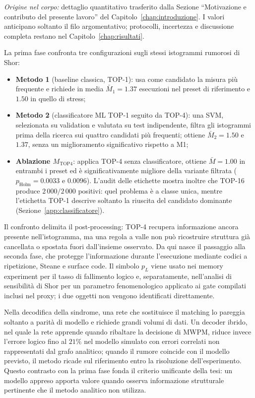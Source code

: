 \begin{onehalfspace}
\noindent\textit{Origine nel corpo:} dettaglio quantitativo trasferito dalla Sezione ``Motivazione e contributo del presente lavoro'' del Capitolo~\ref{chap:introduzione}. I valori anticipano soltanto il filo argomentativo; protocolli, incertezza e discussione completa restano nel Capitolo~\ref{chap:risultati}.

La prima fase confronta tre configurazioni sugli stessi istogrammi rumorosi di Shor:

\begin{itemize}
    \item \textbf{Metodo 1} (baseline classica, TOP-1): usa come candidato la misura più frequente e richiede in media $\bar{M}_1=1.37$ esecuzioni nel preset di riferimento e $1.50$ in quello di stress;
    \item \textbf{Metodo 2} (classificatore \ac{ML} TOP-1 seguito da TOP-4): una \ac{SVM}, selezionata su validation e valutata su test indipendente, filtra gli istogrammi prima della ricerca sui quattro candidati più frequenti; ottiene $\bar{M}_2=1.50$ e $1.37$, senza un miglioramento significativo rispetto a M1;
    \item \textbf{Ablazione $M_{\mathrm{TOP4}}$}: applica TOP-4 senza classificatore, ottiene $\bar{M}=1.00$ in entrambi i preset ed è significativamente migliore della variante filtrata ($p_{\mathrm{Holm}}=0.0033$ e $0.0096$). L'audit delle etichette mostra inoltre che TOP-16 produce $2\,000/2\,000$ positivi: quel problema è a classe unica, mentre l'etichetta TOP-1 descrive soltanto la riuscita del candidato dominante (Sezione~\ref{app:classificatore}).
\end{itemize}

Il confronto delimita il post-processing: TOP-4 recupera informazione ancora presente nell'istogramma, ma una regola a valle non può ricostruire struttura già cancellata o spostata fuori dall'insieme osservato. Da qui nasce il passaggio alla seconda fase, che protegge l'informazione durante l'esecuzione mediante codici a ripetizione, Steane e surface code. Il simbolo $p_L$ viene usato nei memory experiment per il tasso di fallimento logico e, separatamente, nell'analisi di sensibilità di Shor per un parametro fenomenologico applicato ai gate compilati inclusi nel proxy; i due oggetti non vengono identificati direttamente.

Nella decodifica della sindrome, una rete che sostituisce il matching lo pareggia soltanto a parità di modello e richiede grandi volumi di dati. Un decoder ibrido, nel quale la rete apprende quando ribaltare la decisione di \ac{MWPM}, riduce invece l'errore logico fino al $21\%$ nel modello simulato con errori correlati non rappresentati dal grafo analitico; quando il rumore coincide con il modello previsto, il metodo ricade sul riferimento entro la risoluzione dell'esperimento. Questo contrasto con la prima fase fonda il criterio unificante della tesi: un modello appreso apporta valore quando osserva informazione strutturale pertinente che il metodo analitico non utilizza.


\end{onehalfspace}
